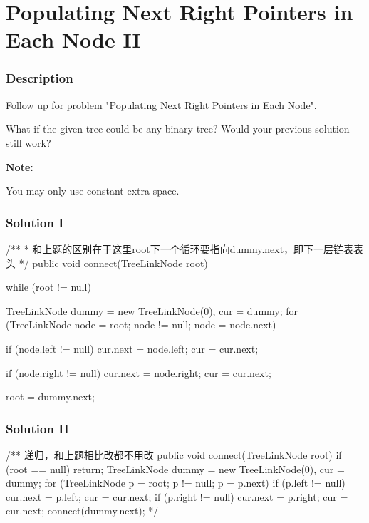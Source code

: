 \newpage

\section{Populating Next Right Pointers in Each Node II} %

\subsubsection{Description}
Follow up for problem "Populating Next Right Pointers in Each Node".

What if the given tree could be any binary tree? Would your previous solution still work?

\textbf{Note:}

You may only use constant extra space.

\subsubsection{Solution I}

\begin{Code}
/**
 * 和上题的区别在于这里root下一个循环要指向dummy.next，即下一层链表表头
 */
public void connect(TreeLinkNode root) {
    while (root != null) {
        TreeLinkNode dummy = new TreeLinkNode(0), cur = dummy;
        for (TreeLinkNode node = root; node != null; node = node.next) {
            if (node.left != null) {
                cur.next = node.left;
                cur = cur.next;
            }

            if (node.right != null) {
                cur.next = node.right;
                cur = cur.next;
            }
        }
        root = dummy.next;
    }
}
\end{Code}

\subsubsection{Solution II}
\begin{Code}
/** 递归，和上题相比改都不用改
public void connect(TreeLinkNode root) {
    if (root == null) {
        return;
    }
    TreeLinkNode dummy = new TreeLinkNode(0), cur = dummy;
    for (TreeLinkNode p = root; p != null; p = p.next) {
        if (p.left != null) {
            cur.next = p.left;
            cur = cur.next;
        }
        if (p.right != null) {
            cur.next = p.right;
            cur = cur.next;
        }
    }
    connect(dummy.next);
}*/
\end{Code}

